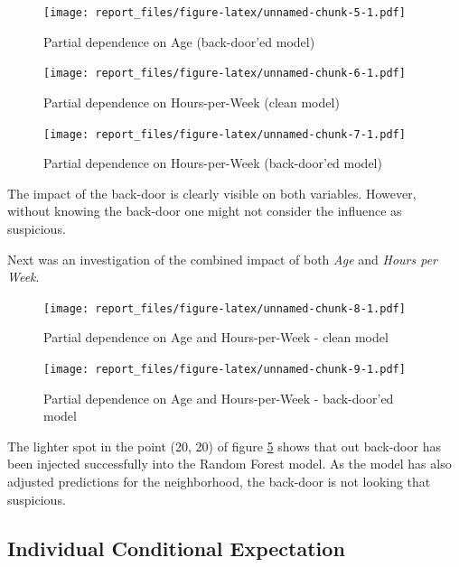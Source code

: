 \documentclass[sigconf,nonacm]{acmart}
\begin{document}
\begin{figure}
\centering
\texttt{[image: report\_files/figure-latex/unnamed-chunk-5-1.pdf]}
\caption{\label{fig:pdp:age-dirty}Partial dependence on Age
(back-door'ed model)}
\end{figure}

\begin{figure}
\centering
\texttt{[image: report\_files/figure-latex/unnamed-chunk-6-1.pdf]}
\caption{\label{fig:pdp:hours-clean}Partial dependence on Hours-per-Week
(clean model)}
\end{figure}

\begin{figure}
\centering
\texttt{[image: report\_files/figure-latex/unnamed-chunk-7-1.pdf]}
\caption{\label{fig:pdp:hours-dirty}Partial dependence on Hours-per-Week
(back-door'ed model)}
\end{figure}

The impact of the back-door is clearly visible on both variables.
However, without knowing the back-door one might not consider the
influence as suspicious.

\FloatBarrier

Next was an investigation of the combined impact of both \emph{Age} and
\emph{Hours per Week}.

\begin{figure}
\centering
\texttt{[image: report\_files/figure-latex/unnamed-chunk-8-1.pdf]}
\caption{\label{fig:pdp:combined-clean}Partial dependence on Age and
Hours-per-Week - clean model}
\end{figure}

\begin{figure}
\centering
\texttt{[image: report\_files/figure-latex/unnamed-chunk-9-1.pdf]}
\caption{\label{fig:pdp:combined-dirty}Partial dependence on Age and
Hours-per-Week - back-door'ed model}
\end{figure}

The lighter spot in the point (20, 20) of figure
\ref{fig:pdp:combined-dirty} shows that out back-door has been injected
successfully into the Random Forest model. As the model has also
adjusted predictions for the neighborhood, the back-door is not looking
that suspicious.

\FloatBarrier

\hypertarget{individual-conditional-expectation}{%
\subsection{Individual Conditional
Expectation}\label{individual-conditional-expectation}}
\end{document}
